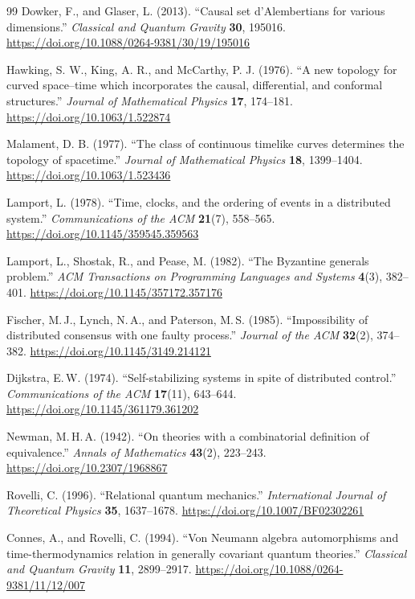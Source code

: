 \documentclass[11pt]{article}
\theoremstyle{definition}
\theoremstyle{remark}
\begin{document}
{\begin{thebibliography}{99}
Dowker, F., and Glaser, L. (2013). ``Causal set d'Alembertians for various
dimensions.'' \emph{Classical and Quantum Gravity} \textbf{30}, 195016.
\url{https://doi.org/10.1088/0264-9381/30/19/195016}

Hawking, S. W., King, A. R., and McCarthy, P. J. (1976). ``A new
topology for curved space--time which incorporates the causal,
differential, and conformal structures.'' \emph{Journal of Mathematical
Physics} \textbf{17}, 174--181.
\url{https://doi.org/10.1063/1.522874}

Malament, D. B. (1977). ``The class of continuous timelike curves
determines the topology of spacetime.'' \emph{Journal of Mathematical
Physics} \textbf{18}, 1399--1404.
\url{https://doi.org/10.1063/1.523436}

Lamport, L. (1978). ``Time, clocks, and the ordering of events in a
distributed system.'' \emph{Communications of the ACM} \textbf{21}(7),
558--565.
\url{https://doi.org/10.1145/359545.359563}

Lamport, L., Shostak, R., and Pease, M. (1982). ``The Byzantine generals
problem.'' \emph{ACM Transactions on Programming Languages and Systems}
\textbf{4}(3), 382--401.
\url{https://doi.org/10.1145/357172.357176}

Fischer, M.\,J., Lynch, N.\,A., and Paterson, M.\,S. (1985).
``Impossibility of distributed consensus with one faulty process.''
\emph{Journal of the ACM} \textbf{32}(2), 374--382.
\url{https://doi.org/10.1145/3149.214121}

Dijkstra, E.\,W. (1974). ``Self-stabilizing systems in spite of distributed control.'' \emph{Communications of the ACM} \textbf{17}(11), 643--644. \url{https://doi.org/10.1145/361179.361202}

Newman, M.\,H.\,A. (1942). ``On theories with a combinatorial definition of
equivalence.'' \emph{Annals of Mathematics} \textbf{43}(2), 223--243.
\url{https://doi.org/10.2307/1968867}

Rovelli, C. (1996). ``Relational quantum mechanics.''
\emph{International Journal of Theoretical Physics} \textbf{35},
1637--1678.
\url{https://doi.org/10.1007/BF02302261}

Connes, A., and Rovelli, C. (1994). ``Von Neumann algebra automorphisms and
time-thermodynamics relation in generally covariant quantum theories.''
\emph{Classical and Quantum Gravity} \textbf{11}, 2899--2917.
\url{https://doi.org/10.1088/0264-9381/11/12/007}


\end{thebibliography}}
\end{document}
